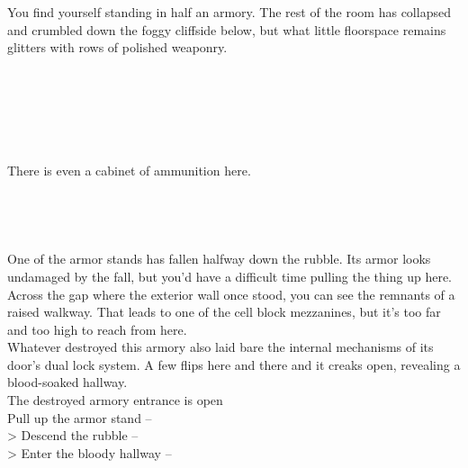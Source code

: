 You find yourself standing in half an armory. The rest of the room has collapsed and crumbled down the foggy cliffside below, but what little floorspace remains glitters with rows of polished weaponry.\\
\\
\\
\\
\\
\\
\\

There is even a cabinet of ammunition here.\\
\\
\\
\\
\\

One of the armor stands has fallen halfway down the rubble. Its armor looks undamaged by the fall, but you’d have a difficult time pulling the thing up here.\\

Across the gap where the exterior wall once stood, you can see the remnants of a raised walkway. That leads to one of the cell block mezzanines, but it's too far and too high to reach from here.\\

Whatever destroyed this armory also laid bare the internal mechanisms of its door's dual lock system. A few flips here and there and it creaks open, revealing a blood-soaked hallway.\\
 The destroyed armory entrance is open\\

 Pull up the armor stand -- \\
> Descend the rubble -- \\
> Enter the bloody hallway -- 